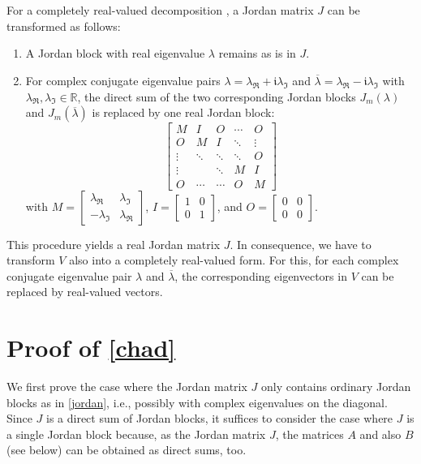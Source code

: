 \documentclass{sn-jnl}
\theoremstyle{definition}
\begin{document}
{For a completely real-valued decomposition \citep[Section~3.4.1]{HJ13}, a Jordan
matrix $J$ can be transformed as follows:
\begin{enumerate}
  \item A Jordan block with real eigenvalue $\lambda$ remains as is in $J$.
  \item For complex conjugate eigenvalue pairs $\lambda = \lambda_\Re +
	\mathfrak{i}\lambda_\Im$ and $\overline{\lambda} = \lambda_\Re - \mathfrak{i}\lambda_\Im$
	with $\lambda_\Re,\lambda_\Im \in \mathbb{R}$, the
	direct sum of the two corresponding Jordan blocks $J_m(\lambda)$ and
	$J_m(\overline{\lambda})$ is replaced by one real Jordan block:
	\[
	  \left[ \begin{array}{*{5}{c}}
		M & I & O & \cdots & O\\
		O & M & I & \ddots & \vdots\\
		\vdots & \ddots & \ddots & \ddots & O\\
		\vdots & & \ddots & M & I\\
		O & \cdots & \cdots & O & M
	  \end{array} \right]
	\]
	with
	  $M = \left[ \begin{array}{cc}
		\lambda_\Re & \lambda_\Im\\
		-\lambda_\Im & \lambda_\Re
	  \end{array} \right]$,
	  $I = \left[ \begin{array}{cc}
		1 & 0\\
		0 & 1
	  \end{array} \right]$, and
	  $O = \left[ \begin{array}{cc}
		0 & 0\\
		0 & 0
	  \end{array} \right]$.
\end{enumerate}
\smallskip

This procedure yields a real Jordan matrix $J$. In consequence, we have to
transform $V$ also into a completely real-valued form. For this, for each complex
conjugate eigenvalue pair $\lambda$ and $\overline{\lambda}$, the corresponding
eigenvectors in $V$ can be replaced by real-valued vectors.

\section{Proof of \cref{chad}}\label{proof:chad}

We first prove the case where the Jordan matrix $J$ only contains ordinary
Jordan blocks as in \cref{jordan}, i.e., possibly with complex eigenvalues
on the diagonal. Since $J$ is a direct sum of Jordan blocks, it suffices to
consider the case where $J$ is a single Jordan block because, as the Jordan
matrix $J$, the matrices $A$ and also $B$ (see below) can be obtained as direct
sums, too.

}
\end{document}
